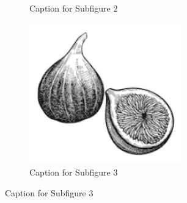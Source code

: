 \documentclass[lettersize,journal]{IEEEtran} %
\begin{document}
\begin{figure}[!t]
\begin{subfigure}{0.3\columnwidth}
      \caption{Caption for Subfigure 2}
      \label{fig:subfig2}
    \end{subfigure}
    \hfill
    \begin{subfigure}{0.3\columnwidth}
      \includegraphics[width=\linewidth]{fig1.png}
      \caption{Caption for Subfigure 3}
      \label{fig:subfig3}
    \end{subfigure}
  
    \medskip
  

\end{figure}
\end{document}
